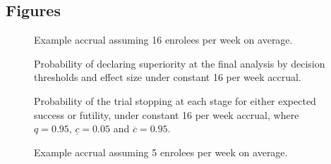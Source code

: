 \documentclass{bmcart}
\begin{document}
\begin{backmatter}




\section*{Figures}

\begin{figure}[!ht] 	  	  	  
	\caption{Example accrual assuming 16 enrolees per week on average.}
	\label{fig:accrual-16}
\end{figure}

\begin{figure}[!ht]
	\caption{Probability of declaring superiority at the final analysis by decision thresholds and effect size under constant 16 per week accrual.}
	\label{fig:decisions-16}
\end{figure}

\begin{figure}[!ht]
\caption{Probability of the trial stopping at each stage for either expected success or futility, under constant 16 per week accrual, where \(q=0.95\), \(\underline{c}=0.05\) and \(\overline{c}=0.95\).}\label{fig:stop-16}
\end{figure}


\begin{figure}[!ht] 	  	  	  
	\caption{Example accrual assuming 5 enrolees per week on average.}
	\label{fig:accrual-5}
\end{figure}


\end{backmatter}
\end{document}
